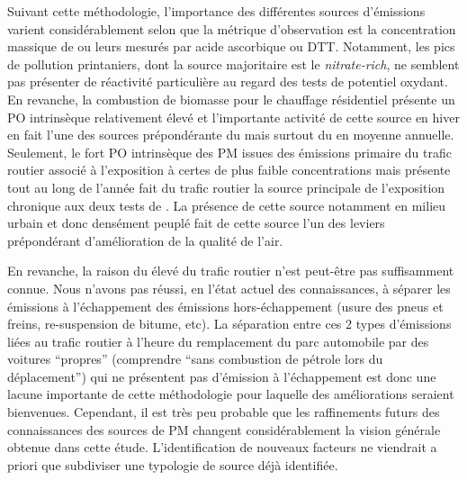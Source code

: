 Suivant cette méthodologie, l'importance des différentes sources d'émissions varient
considérablement selon que la métrique d'observation est la concentration massique de
\PMdix{} ou leurs \POv{} mesurés par acide ascorbique ou DTT. Notamment, les pics de
pollution printaniers, dont la source majoritaire est le \textit{nitrate-rich}, ne
semblent
pas présenter de réactivité particulière au regard des tests de potentiel oxydant. En
revanche, la combustion de biomasse pour le chauffage résidentiel présente un PO
intrinsèque relativement élevé et l'importante activité de cette source en hiver en fait l'une des
sources prépondérante du \PODTTv{} mais surtout du \POAAv{} en moyenne annuelle.  Seulement,
le fort PO intrinsèque des PM issues des émissions primaire du trafic routier associé à
l'exposition à certes de plus faible concentrations mais présente tout au long de l'année
fait du trafic routier la source principale de l'exposition chronique aux deux tests de
\POv.  La présence de cette source notamment en milieu urbain et donc densément
peuplé fait de cette source l'un des leviers prépondérant d'amélioration de la qualité de
l'air.

En revanche, la raison du \POv{} élevé du trafic routier n'est peut-être pas suffisamment
connue.
Nous n'avons pas réussi, en l'état actuel des connaissances, à séparer les émissions à
l'échappement des émissions hors-échappement (usure des pneus et freins, re-suspension de
bitume, etc). 
La séparation entre ces 2 types d'émissions liées au trafic routier à l'heure du
remplacement du parc automobile par des voitures ``propres'' (comprendre ``sans combustion
de pétrole lors du déplacement'') qui ne présentent pas d'émission à l'échappement 
est donc une lacune importante de cette méthodologie pour laquelle des améliorations
seraient bienvenues.
Cependant, il est très peu probable que les raffinements futurs des connaissances des sources de
PM changent considérablement la vision générale obtenue dans cette étude. L'identification de nouveaux
facteurs ne viendrait a priori que subdiviser une typologie de source déjà identifiée.

